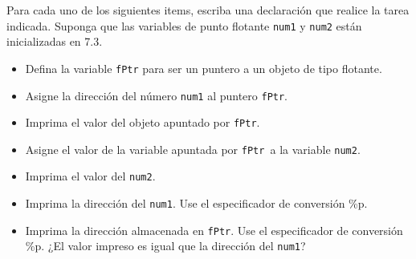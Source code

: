 Para cada uno de los siguientes items, escriba una declaración que realice la tarea indicada. Suponga que las variables de punto flotante \texttt{num1} y \texttt{num2} están inicializadas en 7.3.
\begin{itemize}[a)]
\item Defina la variable \texttt{fPtr} para ser un puntero a un objeto de tipo flotante.
\item Asigne la dirección del número \texttt{num1} al puntero \texttt{fPtr}.
\item Imprima el valor del objeto apuntado por \texttt{fPtr}.
\item Asigne el valor de la variable apuntada por \texttt{fPtr }a la variable \texttt{num2}.
\item Imprima el valor del \texttt{num2}.
\item Imprima la dirección del \texttt{num1}. Use el especificador de conversión \%p.
\item Imprima la dirección almacenada en \texttt{fPtr}. Use el especificador de conversión \%p. ¿El valor impreso es igual que la dirección del \texttt{num1}?
\end{itemize}


